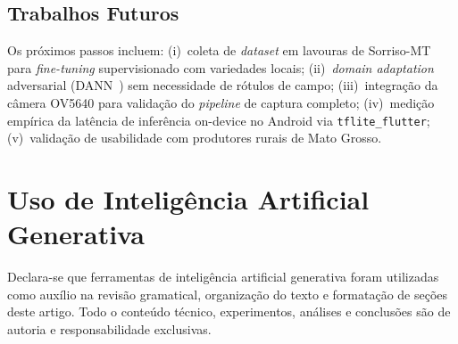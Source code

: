\documentclass[12pt]{article}
\begin{document}
\subsection{Trabalhos Futuros}

Os próximos passos incluem: (i)~coleta de \textit{dataset} em lavouras de Sorriso-MT
para \textit{fine-tuning} supervisionado com variedades locais; (ii)~\textit{domain
adaptation} adversarial (DANN~\cite{ganin2016}) sem necessidade de rótulos de campo;
(iii)~integração da câmera OV5640 para validação do \textit{pipeline} de captura
completo;
(iv)~medição empírica da latência de inferência on-device no Android via
\texttt{tflite\_flutter}; (v)~validação de usabilidade com produtores rurais de
Mato Grosso.


\section*{Uso de Inteligência Artificial Generativa}

Declara-se que ferramentas de inteligência artificial generativa
foram utilizadas como auxílio na revisão gramatical, organização do
texto e formatação de seções deste artigo. Todo o conteúdo técnico,
experimentos, análises e conclusões são de autoria e responsabilidade exclusivas.



\end{document}

